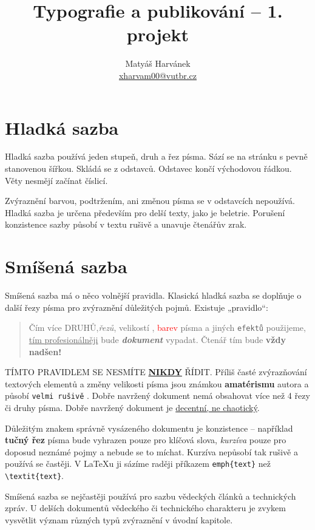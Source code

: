 \documentclass[a4paper, twocolumn, 10pt]{article}
\title{Typografie a publikování – 1. projekt}
\author{Matyáš Harvánek \\\href{mailto:xharvam00@vutbr.cz}{xharvam00@vutbr.cz}}
\date{}
\begin{document}
\maketitle

\section{Hladká sazba}
Hladká sazba používá jeden stupeň, druh a řez písma. Sází
se na stránku s pevně stanovenou šířkou. Skládá se z odstavců. Odstavec končí východovou řádkou. Věty nesmějí
začínat číslicí. 

  Zvýraznění barvou, podtržením, ani změnou písma se
v odstavcích nepoužívá. Hladká sazba je určena především
pro delší texty, jako je beletrie. Porušení konzistence sazby
působí v textu rušivě a unavuje čtenářův zrak.


\section{Smíšená sazba}

Smíšená sazba má o něco volnější pravidla. Klasická hladká
sazba se doplňuje o další řezy písma pro zvýraznění důležitých pojmů. Existuje „pravidlo“:
\begin{quote}
\hspace{1em} Čím více \MakeUppercase{druhů},\textit{řezů},  {\tiny{velikostí}} , {\textcolor{red}{barev}}  písma
a jiných {\texttt{efektů}}  použijeme, {\underline{tím profesionálněji}}
bude  {\textit{\textbf{\small{dokument}}}} vypadat. Čtenář tím bude {\LARGE{\textbf{vždy nadšen!}}} 
\end{quote}

\MakeUppercase{Tímto pravidlem se nesmíte {\textbf{\underline{nikdy}}} řídit}. Příliš časté zvýrazňování textových elementů a změny {\tiny{velikosti}}
písma jsou známkou {\textbf{amatérismu}} autora a působí {\texttt{velmi
rušivě}} . Dobře navržený dokument nemá obsahovat více
než 4 řezy či druhy písma. Dobře navržený dokument je
{\underline{decentní, ne chaotický}}.

Důležitým znakem správně vysázeného dokumentu je
konzistence – například {\textbf{tučný řez}} písma bude vyhrazen
pouze pro klíčová slova, {\textit{kurzíva}} pouze pro doposud neznámé pojmy a nebude se to míchat. Kurzíva  nepůsobí tak
rušivě a používá se častěji. V \LaTeX{}u ji sázíme raději příkazem {\verb|emph{text}|} než {\verb|\textit{text}|}.

Smíšená sazba se nejčastěji používá pro sazbu vědeckých
článků a technických zpráv. U delších dokumentů vědeckého či technického charakteru je zvykem vysvětlit význam
různých typů zvýraznění v úvodní kapitole.
\end{document}
